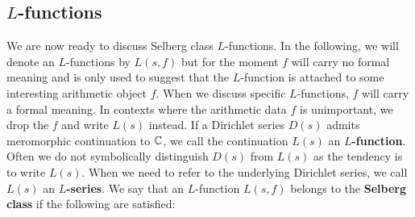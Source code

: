     \subsection*{\texorpdfstring{$L$}{L}-functions}
      We are now ready to discuss Selberg class $L$-functions. In the following, we will denote an $L$-functions by $L(s,f)$ but for the moment $f$ will carry no formal meaning and is only used to suggest that the $L$-function is attached to some interesting arithmetic object $f$. When we discuss specific $L$-functions, $f$ will carry a formal meaning. In contexts where the arithmetic data $f$ is unimportant, we drop the $f$ and write $L(s)$ instead. If a Dirichlet series $D(s)$ admits meromorphic continuation to $\mathbb{C}$, we call the continuation $L(s)$ an \textbf{$L$-function}. Often we do not symbolically distinguish $D(s)$ from $L(s)$ as the tendency is to write $L(s)$. When we need to refer to the underlying Dirichlet series, we call $L(s)$ an \textbf{$L$-series}. We say that an $L$-function $L(s,f)$ belongs to the \textbf{Selberg class} if the following are satisfied:
